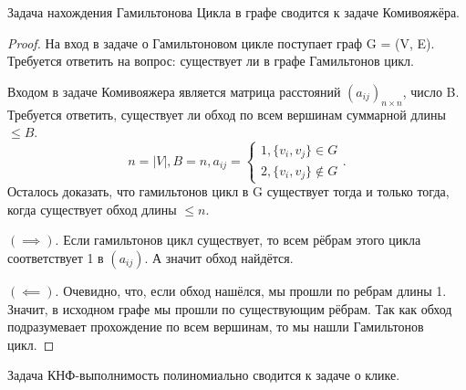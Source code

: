 \begin{theorem}
Задача нахождения Гамильтонова Цикла в графе сводится к задаче Комивояжёра.
\end{theorem}
\begin{proof}
На вход в задаче о Гамильтоновом цикле поступает граф G = (V, E). Требуется
ответить на вопрос: существует ли в графе Гамильтонов цикл. 

Входом в задаче Комивояжера является матрица расстояний $\left( a_{ij}
\right)_{n\times n}
$, число B. Требуется ответить, существует ли обход по всем вершинам суммарной
длины $\le B$.
\[
n=|V|, B = n, a_{ij} = \begin{cases}
	
	1, \{v_i, v_j\} \in G\\
	2,  \{v_i, v_j\} \notin G
\end{cases}
.\]
Осталось доказать, что гамильтонов цикл в G существует тогда и только тогда,
когда существует обход длины $\le n$. 

$\left( \implies \right) $. Если гамильтонов цикл существует, то всем рёбрам
этого цикла соответствует 1 в $\left( a_{ij} \right) $. А значит обход найдётся. 

$\left( \impliedby \right) $. Очевидно, что, если обход нашёлся, мы прошли по
ребрам длины 1. Значит, в исходном графе мы прошли по существующим рёбрам. Так
как обход подразумевает прохождение по всем вершинам, то мы нашли Гамильтонов
цикл.
\end{proof}
\begin{theorem}
Задача КНФ-выполнимость полиномиально сводится к задаче о клике.
\end{theorem}

